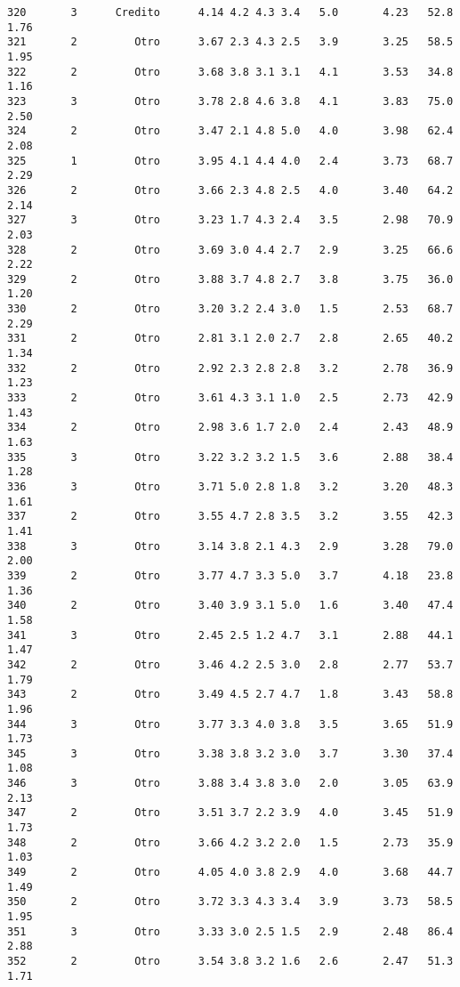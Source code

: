 \documentclass[
  letterpaper,
  DIV=11,
  numbers=noendperiod]{scrartcl}
\begin{document}
\begin{verbatim}
320       3      Credito      4.14 4.2 4.3 3.4   5.0       4.23   52.8    1.76
321       2         Otro      3.67 2.3 4.3 2.5   3.9       3.25   58.5    1.95
322       2         Otro      3.68 3.8 3.1 3.1   4.1       3.53   34.8    1.16
323       3         Otro      3.78 2.8 4.6 3.8   4.1       3.83   75.0    2.50
324       2         Otro      3.47 2.1 4.8 5.0   4.0       3.98   62.4    2.08
325       1         Otro      3.95 4.1 4.4 4.0   2.4       3.73   68.7    2.29
326       2         Otro      3.66 2.3 4.8 2.5   4.0       3.40   64.2    2.14
327       3         Otro      3.23 1.7 4.3 2.4   3.5       2.98   70.9    2.03
328       2         Otro      3.69 3.0 4.4 2.7   2.9       3.25   66.6    2.22
329       2         Otro      3.88 3.7 4.8 2.7   3.8       3.75   36.0    1.20
330       2         Otro      3.20 3.2 2.4 3.0   1.5       2.53   68.7    2.29
331       2         Otro      2.81 3.1 2.0 2.7   2.8       2.65   40.2    1.34
332       2         Otro      2.92 2.3 2.8 2.8   3.2       2.78   36.9    1.23
333       2         Otro      3.61 4.3 3.1 1.0   2.5       2.73   42.9    1.43
334       2         Otro      2.98 3.6 1.7 2.0   2.4       2.43   48.9    1.63
335       3         Otro      3.22 3.2 3.2 1.5   3.6       2.88   38.4    1.28
336       3         Otro      3.71 5.0 2.8 1.8   3.2       3.20   48.3    1.61
337       2         Otro      3.55 4.7 2.8 3.5   3.2       3.55   42.3    1.41
338       3         Otro      3.14 3.8 2.1 4.3   2.9       3.28   79.0    2.00
339       2         Otro      3.77 4.7 3.3 5.0   3.7       4.18   23.8    1.36
340       2         Otro      3.40 3.9 3.1 5.0   1.6       3.40   47.4    1.58
341       3         Otro      2.45 2.5 1.2 4.7   3.1       2.88   44.1    1.47
342       2         Otro      3.46 4.2 2.5 3.0   2.8       2.77   53.7    1.79
343       2         Otro      3.49 4.5 2.7 4.7   1.8       3.43   58.8    1.96
344       3         Otro      3.77 3.3 4.0 3.8   3.5       3.65   51.9    1.73
345       3         Otro      3.38 3.8 3.2 3.0   3.7       3.30   37.4    1.08
346       3         Otro      3.88 3.4 3.8 3.0   2.0       3.05   63.9    2.13
347       2         Otro      3.51 3.7 2.2 3.9   4.0       3.45   51.9    1.73
348       2         Otro      3.66 4.2 3.2 2.0   1.5       2.73   35.9    1.03
349       2         Otro      4.05 4.0 3.8 2.9   4.0       3.68   44.7    1.49
350       2         Otro      3.72 3.3 4.3 3.4   3.9       3.73   58.5    1.95
351       3         Otro      3.33 3.0 2.5 1.5   2.9       2.48   86.4    2.88
352       2         Otro      3.54 3.8 3.2 1.6   2.6       2.47   51.3    1.71

\end{verbatim}
\end{document}

